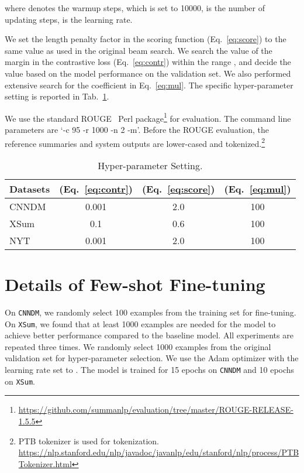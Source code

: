 \documentclass[11pt]{article}
\begin{document}
where  denotes the warmup steps, which is set to 10000,  is the number of updating steps,  is the learning rate.


We set the length penalty factor  in the scoring function (Eq.~\ref{eq:score}) to the same value as used in the original beam search.
We search the value of the margin  in the contrastive loss (Eq.~\ref{eq:contr}) within the range 
,
and decide the value based on the model performance on the validation set.
We also performed extensive search for the coefficient  in Eq.~\ref{eq:mul}.
The specific hyper-parameter setting is reported in Tab.~\ref{tab:appendix}.

We use the standard ROUGE~\citep{lin-2004-rouge} Perl package\footnote{\url{https://github.com/summanlp/evaluation/tree/master/ROUGE-RELEASE-1.5.5}} for evaluation.
The command line parameters are `-c 95 -r 1000 -n 2 -m'.
Before the ROUGE evaluation, the reference summaries and system outputs are lower-cased and tokenized.\footnote{PTB tokenizer is used for tokenization. \url{https://nlp.stanford.edu/nlp/javadoc/javanlp/edu/stanford/nlp/process/PTBTokenizer.html}}


\begin{table}[t]
\centering
\begin{tabular}{lccc}
\toprule
\textbf{Datasets} &   (Eq.~\ref{eq:contr}) &  (Eq.~\ref{eq:score})   &   (Eq.~\ref{eq:mul}) \\
\midrule
 CNNDM & 0.001 & 2.0 & 100 \\
 XSum & 0.1 & 0.6 & 100 \\
 NYT & 0.001 & 2.0 & 100  \\
\bottomrule
\end{tabular}
\caption{\label{tab:appendix} Hyper-parameter Setting.}
\end{table}

\section{Details of Few-shot Fine-tuning}
\label{appendix:few-shot}

On \texttt{CNNDM}, we randomly select 100 examples from the training set for fine-tuning.
On \texttt{XSum}, we found that at least 1000 examples are needed for the model to achieve better performance compared to the baseline model.
All experiments are repeated three times.
We randomly select 1000 examples from the original validation set for hyper-parameter selection.
We use the Adam optimizer with the learning rate set to .
The model is trained for 15 epochs on \texttt{CNNDM} and 10 epochs on \texttt{XSum}.
\end{document}
